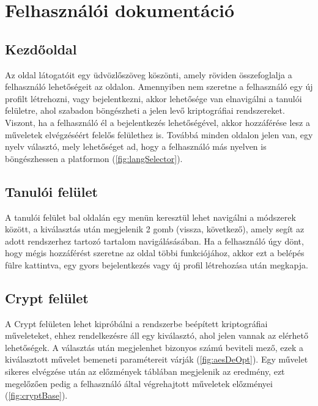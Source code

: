 \chapter{Felhasználói dokumentáció}

\section{Kezdőoldal}
Az oldal látogatóit egy üdvözlőszöveg köszönti, amely röviden összefoglalja a felhasználó lehetőségeit az oldalon.
Amennyiben nem szeretne a felhasználó egy új profilt létrehozni, vagy bejelentkezni, akkor lehetősége van elnavigálni a tanulói felületre, ahol szabadon böngészheti a jelen levő kriptográfiai rendszereket.
Viszont, ha a felhasználó él a bejelentkezés lehetőségével, akkor hozzáférése lesz a műveletek elvégzéséért felelős felülethez is.
Továbbá minden oldalon jelen van, egy nyelv választó, mely lehetőséget ad, hogy a felhasználó más nyelven is böngészhessen a platformon (\ref{fig:langSelector}).


\section{Tanulói felület}
A tanulói felület bal oldalán egy menün keresztül lehet navigálni a módszerek között, a kiválasztás után megjelenik 2 gomb (vissza, következő), amely segít az adott rendszerhez tartozó tartalom navigálásásában.
Ha a felhasználó úgy dönt, hogy mégis hozzáférést szeretne az oldal többi funkciójához, akkor ezt a belépés fülre kattintva, egy gyors bejelentkezés vagy új profil létrehozása után megkapja.



\section{Crypt felület}
A Crypt felületen lehet kipróbálni a rendszerbe beépített kriptográfiai műveleteket, ehhez rendelkezésre áll egy kiválasztó, ahol jelen vannak az elérhető lehetőségek. A választás után megjelenhet bizonyos számú beviteli mező, ezek a kiválasztott művelet bemeneti paramétereit várják (\ref{fig:aesDeOpt}).
Egy művelet sikeres elvégzése után az előzmények táblában megjelenik az eredmény, ezt megelőzően pedig a felhasználó által végrehajtott műveletek előzményei (\ref{fig:cryptBase}).



